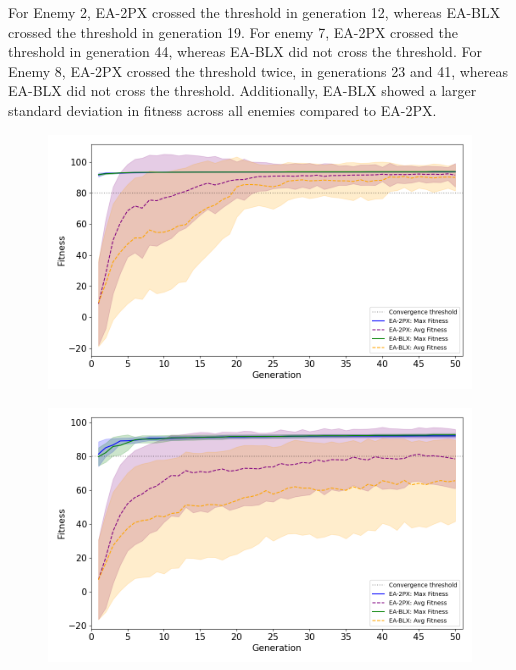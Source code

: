 For Enemy 2, EA-2PX crossed the threshold in generation 12, whereas EA-BLX crossed the threshold in generation 19.
For enemy 7, EA-2PX crossed the threshold in generation 44, whereas EA-BLX did not cross the threshold.
For Enemy 8, EA-2PX crossed the threshold twice, in generations 23 and 41, whereas EA-BLX did not cross the threshold.
Additionally, EA-BLX showed a larger standard deviation in fitness across all enemies compared to EA-2PX.

\begin{figure}[htbp]
    \centering
    \includegraphics[width=\linewidth]{../../plots/enemy2}
    \caption{}
    \label{fig:enemy2}
\end{figure}
\begin{figure}[htbp]
    \centering
    \includegraphics[width=\linewidth]{../../plots/enemy7}
    \caption{}
    \label{fig:enemy7}
\end{figure}
